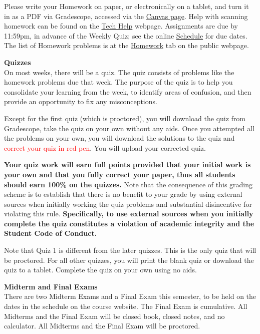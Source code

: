 \documentclass[12pt]{article}
\renewcommand{\emph}[1]{\textsf{\textbf{#1}}}
\newcommand{\localhead}[1]{\par\smallskip\textbf{#1} \smallskip\nobreak\\}%
\def\heading#1{\localhead{\large\emph{#1}}}
\begin{document}
Please write your Homework on paper, or electronically on a tablet, and turn it in as a PDF via Gradescope, accessed via the \href{https://canvas.alaska.edu/courses/16194}{Canvas page}.  Help with scanning homework can be found on the \href{https://uaf-math251.github.io/techHelp.html}{Tech Help} webpage.  Assignments are due by 11:59pm, in advance of the Weekly Quiz; see the online  \href{https://docs.google.com/spreadsheets/d/e/2PACX-1vSetyTdOP14yatuWNH7CuB9yCT3zqOhFWYmCj1BzRAZhU4eHCXCJaRjnCgxgZW_NieE59iLRok3NdzK/pubhtml?gid=0&single=true}{Schedule} for due dates.  The list of Homework problems is at the \href{https://uaf-math251.github.io/calc2/homework.html}{Homework} tab on the public webpage.

\heading{Quizzes}
On most weeks, there will be a quiz.  The quiz consists of problems like the homework problems due that week. The purpose of the quiz is to help you consolidate your learning from the week, to identify areas of confusion, and then provide an opportunity to fix any misconceptions.  

Except for the first quiz (which is proctored), you will download the quiz from Gradescope, take the quiz on your own without any aids. Once you attempted all the problems on your own, you will download the solutions to the quiz and \textcolor{red}{correct your quiz in red pen}. You will upload your corrected quiz. 

\textbf{Your quiz work will earn full points provided that your initial work is your own and that you fully correct your paper, thus all students should earn 100\% on the quizzes.} Note that the consequence of this grading scheme is to establish that there is no benefit to your grade by using external sources when initially working the quiz problems and substantial disincentive for violating this rule. \textbf{Specifically, to use external sources when you initially complete the quiz constitutes a violation of academic integrity and the Student Code of Conduct. }

Note that Quiz 1 is different from the later quizzes. This is the only quiz that will be proctored. For all other quizzes, you will print the blank quiz or download the quiz to a tablet. Complete the quiz on your own using no aids. 

\heading{Midterm and Final Exams}
There are two Midterm Exams and a Final Exam this semester, to be held on the dates in the schedule on the course website. The Final Exam is cumulative. All Midterms and the Final Exam will be closed book, closed notes, and no calculator. All Midterms and the Final Exam will be proctored.\\
\end{document}
